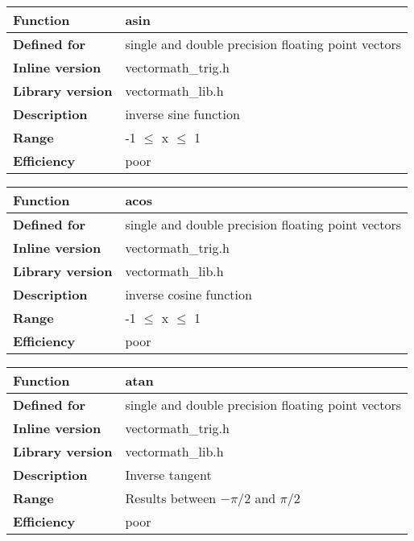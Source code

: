 \documentclass[vcl_manual.tex]{subfiles}
\begin{document}
\begin{tabular}{|p{30mm}|p{120mm}|}
\hline
\bfseries Function & asin \\ \hline
\bfseries Defined for & single and double precision floating point vectors \\ \hline
\bfseries Inline version & vectormath\_trig.h \\ \hline
\bfseries Library version & vectormath\_lib.h \\ \hline
\bfseries Description & inverse sine function \\ \hline
\bfseries Range & -1 $\leq$ x $\leq$ 1 \\ \hline
\bfseries Efficiency & poor \\ \hline
\end{tabular}


\begin{tabular}{|p{30mm}|p{120mm}|}
\hline
\bfseries Function & acos \\ \hline
\bfseries Defined for & single and double precision floating point vectors \\ \hline
\bfseries Inline version & vectormath\_trig.h \\ \hline
\bfseries Library version & vectormath\_lib.h \\ \hline
\bfseries Description & inverse cosine function \\ \hline
\bfseries Range & -1 $\leq$ x $\leq$ 1 \\ \hline
\bfseries Efficiency & poor \\ \hline
\end{tabular}


\begin{tabular}{|p{30mm}|p{120mm}|}
\hline
\bfseries Function & atan \\ \hline
\bfseries Defined for & single and double precision floating point vectors \\ \hline
\bfseries Inline version & vectormath\_trig.h \\ \hline
\bfseries Library version & vectormath\_lib.h \\ \hline
\bfseries Description & Inverse tangent \\ \hline
\bfseries Range & Results between $-\pi/2$ and $\pi/2$ \\ \hline
\bfseries Efficiency & poor \\ \hline
\end{tabular}
\end{document}
